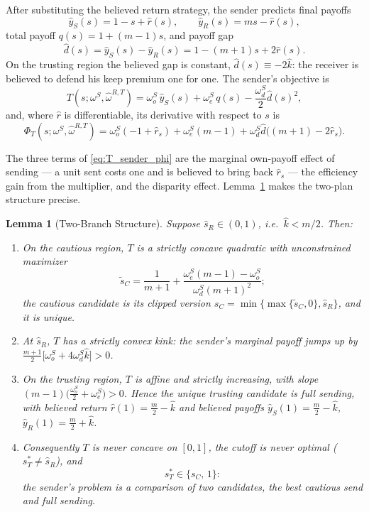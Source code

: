 \documentclass[11pt]{article}
\theoremstyle{plain}
\newtheorem{lemma}{Lemma}
\theoremstyle{remark}
\begin{document}
After substituting the believed return strategy, the sender predicts final payoffs
\[
        \hat y_S(s)=1-s+\hat r(s),
        \qquad
        \hat y_R(s)=ms-\hat r(s),
\]
total payoff $q(s)=1+(m-1)s$, and payoff gap
\[
        \hat d(s)=\hat y_S(s)-\hat y_R(s)
        =1-(m+1)s+2\hat r(s).
\]
On the trusting region the believed gap is constant, $\hat d(s)\equiv-2\hat k$: the receiver is believed to defend his keep premium one for one.  The sender's objective is
\begin{equation}
\label{eq:T_sender_objective}
        T(s;\omega^S,\hat\omega^{R,T})
        =
        \omega_o^S\,\hat y_S(s)
        +\omega_e^S\,q(s)
        -\frac{\omega_d^S}{2}\hat d(s)^2 ,
\end{equation}
and, where $\hat r$ is differentiable, its derivative with respect to $s$ is
\begin{equation}
\label{eq:T_sender_phi}
        \Phi_T(s;\omega^S,\hat\omega^{R,T})
        =
        \omega_o^S(-1+\hat r_s)
        +\omega_e^S(m-1)
        +\omega_d^S\hat d\big((m+1)-2\hat r_s\big).
\end{equation}

The three terms of \eqref{eq:T_sender_phi} are the marginal own-payoff effect of sending --- a unit sent costs one and is believed to bring back $\hat r_s$ --- the efficiency gain from the multiplier, and the disparity effect.  Lemma~\ref{lem:twobranch} makes the two-plan structure precise.

\begin{lemma}[Two-Branch Structure]
\label{lem:twobranch}
Suppose $\hat s_R\in(0,1)$, i.e.\ $\hat k<m/2$.  Then:
\begin{enumerate}[topsep=2pt,itemsep=2pt]
\item On the cautious region, $T$ is a strictly concave quadratic with unconstrained maximizer
\[
        \tilde s_C
        =
        \frac{1}{m+1}
        +
        \frac{\omega_e^S(m-1)-\omega_o^S}{\omega_d^S(m+1)^2};
\]
the \emph{cautious candidate} is its clipped version $s_C=\min\{\max\{\tilde s_C,0\},\hat s_R\}$, and it is unique.
\item At $\hat s_R$, $T$ has a strictly \emph{convex} kink: the sender's marginal payoff jumps up by $\tfrac{m+1}2\big[\omega_o^S+4\omega_d^S\hat k\big]>0$.
\item On the trusting region, $T$ is affine and strictly increasing, with slope $(m-1)\big(\tfrac{\omega_o^S}2+\omega_e^S\big)>0$.  Hence the unique trusting candidate is full sending, with believed return $\hat r(1)=\tfrac m2-\hat k$ and believed payoffs $\hat y_S(1)=\tfrac m2-\hat k$, $\hat y_R(1)=\tfrac m2+\hat k$.
\item Consequently $T$ is never concave on $[0,1]$, the cutoff is never optimal ($s_T^\ast\ne\hat s_R$), and
\[
        s_T^\ast\in\{s_C,\,1\}:
\]
the sender's problem is a comparison of two candidates, the best cautious send and full sending.
\end{enumerate}
\end{lemma}
\end{document}
